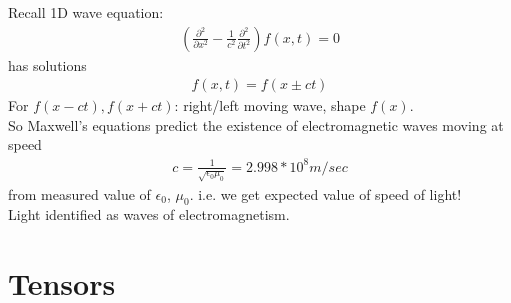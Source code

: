 \documentclass[a4paper]{article}
\begin{document}
Recall 1D wave equation:
\begin{equation*}
\begin{aligned}
\left(\frac{\partial^2}{\partial x^2} - \frac{1}{c^2}\frac{\partial^2}{\partial t^2}\right) f\left(x,t\right) = 0
\end{aligned}
\end{equation*}
has solutions
\begin{equation*}
\begin{aligned}
f\left(x,t\right) = f\left(x\pm ct\right)
\end{aligned}
\end{equation*}
For $f\left(x-ct\right),f\left(x+ct\right)$: right/left moving wave, shape $f\left(x\right)$.\\
So Maxwell's equations predict the existence of electromagnetic waves moving at speed
\begin{equation*}
\begin{aligned}
c=\frac{1}{\sqrt{\epsilon_0 \mu_0}}=2.998*10^8 m/sec
\end{aligned}
\end{equation*}
from measured value of $\epsilon_0$, $\mu_0$. i.e. we get expected value of speed of light!\\
Light identified as waves of electromagnetism.

\newpage
\section{Tensors}
\end{document}
